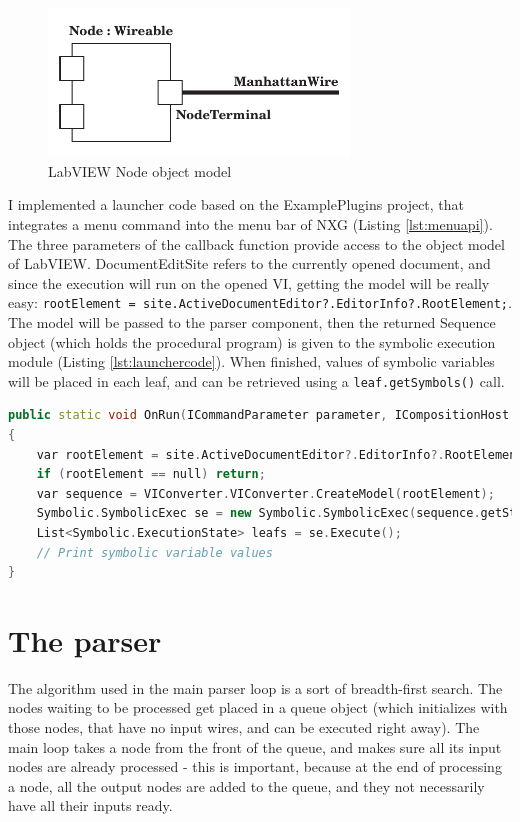 \begin{figure}

\centering
\includegraphics[width=80mm,keepaspectratio]{figures/lvobject.pdf}
\caption{LabVIEW Node object model} 
\label{fig:lvobject}
\end{figure}
I implemented a launcher code based on the ExamplePlugins project, that integrates a menu command into the menu bar of NXG (Listing \ref{lst:menuapi}). The three parameters of the callback function provide access to the object model of LabVIEW. DocumentEditSite refers to the currently opened document, and since the execution will run on the opened VI, getting the model will be really easy: \lstinline[columns=fixed]{rootElement = site.ActiveDocumentEditor?.EditorInfo?.RootElement;}. The model will be passed to the parser component, then the returned Sequence object (which holds the procedural program) is given to the symbolic execution module (Listing \ref{lst:launchercode}). When finished, values of symbolic variables will be placed in each leaf, and can be retrieved using a \lstinline[columns=fixed]{leaf.getSymbols()} call.
\lstset{escapechar=@}
\begin{lstlisting}[frame=single,escapechar=@,float=!ht,caption={Launcher code},captionpos=b,label={lst:launchercode},language=C++]
public static void OnRun(ICommandParameter parameter, ICompositionHost host, DocumentEditSite site)
{
    var rootElement = site.ActiveDocumentEditor?.EditorInfo?.RootElement;
    if (rootElement == null) return;
    var sequence = VIConverter.VIConverter.CreateModel(rootElement);
    Symbolic.SymbolicExec se = new Symbolic.SymbolicExec(sequence.getStatements());
    List<Symbolic.ExecutionState> leafs = se.Execute();
    // Print symbolic variable values
}
\end{lstlisting}
\section{The parser}
The algorithm used in the main parser loop is a sort of breadth-first search. The nodes waiting to be processed get placed in a queue object (which initializes with those nodes, that have no input wires, and can be executed right away). The main loop takes a node from the front of the queue, and makes sure all its input nodes are already processed - this is important, because at the end of processing a node, all the output nodes are added to the queue, and they not necessarily have all their inputs ready. 

